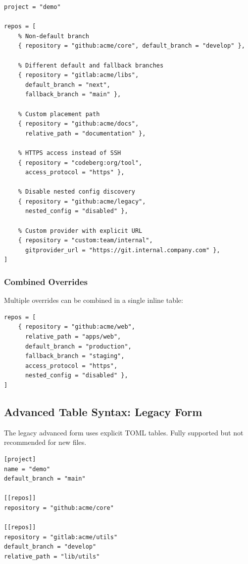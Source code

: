 \begin{lstlisting}
project = "demo"

repos = [
    % Non-default branch
    { repository = "github:acme/core", default_branch = "develop" },
    
    % Different default and fallback branches
    { repository = "gitlab:acme/libs", 
      default_branch = "next", 
      fallback_branch = "main" },
    
    % Custom placement path
    { repository = "github:acme/docs", 
      relative_path = "documentation" },
    
    % HTTPS access instead of SSH
    { repository = "codeberg:org/tool", 
      access_protocol = "https" },
    
    % Disable nested config discovery
    { repository = "github:acme/legacy", 
      nested_config = "disabled" },
    
    % Custom provider with explicit URL
    { repository = "custom:team/internal", 
      gitprovider_url = "https://git.internal.company.com" },
]
\end{lstlisting}

\subsubsection{Combined Overrides}

Multiple overrides can be combined in a single inline table:

\begin{lstlisting}
repos = [
    { repository = "github:acme/web", 
      relative_path = "apps/web", 
      default_branch = "production", 
      fallback_branch = "staging",
      access_protocol = "https",
      nested_config = "disabled" },
]
\end{lstlisting}

\subsection{Advanced Table Syntax: Legacy Form}
\label{subsec:cgs-advanced}

The legacy advanced form uses explicit TOML tables. Fully supported but not
recommended for new files.

\begin{lstlisting}
[project]
name = "demo"
default_branch = "main"

[[repos]]
repository = "github:acme/core"

[[repos]]
repository = "gitlab:acme/utils"
default_branch = "develop"
relative_path = "lib/utils"
\end{lstlisting}

